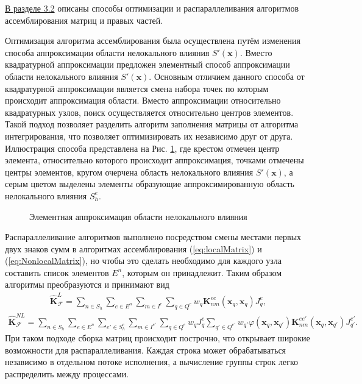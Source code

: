 \underline{В разделе 3.2} описаны способы оптимизации и распараллеливания алгоритмов ассемблирования матриц и правых частей.

Оптимизация алгоритма ассемблирования была осуществлена путём изменения способа аппроксимации области нелокального влияния $S'(\boldsymbol{x})$. Вместо квадратурной аппроксимации предложен элементный способ аппроксимации области нелокального влияния $S'(\boldsymbol{x})$. Основным отличием данного способа от квадратурной аппроксимации является смена набора точек по которым происходит аппроксимация области. Вместо аппроксимации относительно квадратурных узлов, поиск осуществляется относительно центров элементов. Такой подход позволяет разделить алгоритм заполнения матрицы от алгоритма интегрирования, что позволяет оптимизировать их независимо друг от друга. Иллюстрация способа представлена на Рис. \ref{fig:ApproxSE}, где крестом отмечен центр элемента, относительно которого происходит аппроксимация, точками отмечены центры элементов, кругом очерчена область нелокального влияния $S'(\boldsymbol{x})$, а серым цветом выделены элементы образующие аппроксимированную область нелокального влияния $S_h^e$.

\begin{figure}[ht]
    \caption{Элементная аппроксимация области нелокального влияния}\label{fig:ApproxSE}
\end{figure}

Распараллеливание алгоритмов выполнено посредством смены местами первых двух знаков сумм в алгоритмах ассемблирования (\ref{eq:localMatrix}) и (\ref{eq:NonlocalMatrix}), но чтобы это сделать необходимо для каждого узла составить список элементов $E^n$, которым он принадлежит. Таким образом алгоритмы преобразуются и принимают вид
\begin{gather*}
	\widehat{\textbf{K}}^L_{\mathcal{F}} =
	\sum\limits_{n \in S_h}
	\sum\limits_{e \in E^n}
	\sum\limits_{m \in I^e}
	\sum\limits_{q \in Q^e}
	w_q \textbf{K}^{ee}_{nm} (\boldsymbol{x}_q, \boldsymbol{x}_q) J_q^e,
\end{gather*}
\begin{gather}
	\label{eq:ParallelNonlocalMatrix}
	\widehat{\textbf{K}}^{NL}_{\mathcal{F}} =
	\sum\limits_{n \in S_h}
	\sum\limits_{e \in E^n}
	\sum\limits_{e' \in S_h^e}
	\sum\limits_{m \in I^{e'}}
	\sum\limits_{q \in Q^e}
	w_q J_q^e
	\sum\limits_{q' \in Q^{e'}}
	w_{q'} \varphi(\boldsymbol{x}_q, \boldsymbol{x}_{q'}) 
	\textbf{K}_{nm}^{e e'}(\boldsymbol{x}_q, \boldsymbol{x}_{q'}) J_{q'}^{e'}.
\end{gather}
При таком подходе сборка матриц происходит построчно, что открывает широкие возможности для распараллеливания. Каждая строка может обрабатываться независимо в отдельном потоке исполнения, а вычисление группы строк легко распределить между процессами.

